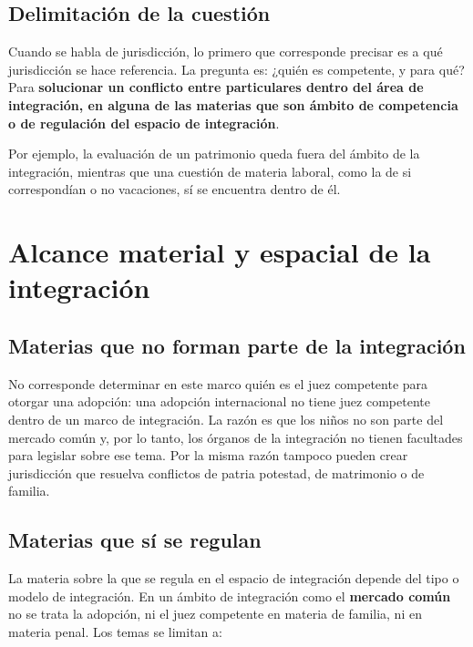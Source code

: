 \documentclass[12pt,oneside]{book}
\begin{document}
\subsection{Delimitación de la cuestión}

Cuando se habla de jurisdicción, lo primero que corresponde precisar es a qué jurisdicción se hace referencia. La pregunta es: ¿quién es competente, y para qué? Para \textbf{solucionar un conflicto entre particulares dentro del área de integración, en alguna de las materias que son ámbito de competencia o de regulación del espacio de integración}.

Por ejemplo, la evaluación de un patrimonio queda fuera del ámbito de la integración, mientras que una cuestión de materia laboral, como la de si correspondían o no vacaciones, sí se encuentra dentro de él.


\section{Alcance material y espacial de la integración}

\subsection{Materias que no forman parte de la integración}

No corresponde determinar en este marco quién es el juez competente para otorgar una adopción: una adopción internacional no tiene juez competente dentro de un marco de integración. La razón es que los niños no son parte del mercado común y, por lo tanto, los órganos de la integración no tienen facultades para legislar sobre ese tema. Por la misma razón tampoco pueden crear jurisdicción que resuelva conflictos de patria potestad, de matrimonio o de familia.

\subsection{Materias que sí se regulan}

La materia sobre la que se regula en el espacio de integración depende del tipo o modelo de integración. En un ámbito de integración como el \textbf{mercado común} no se trata la adopción, ni el juez competente en materia de familia, ni en materia penal. Los temas se limitan a:
\end{document}
